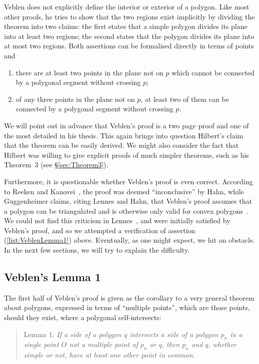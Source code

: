 Veblen does not explicitly define the interior or exterior of a polygon. Like most other proofs, he tries to show that the two regions exist implicitly by dividing the theorem into two claims: the first states that a simple polygon divides its plane into at least two regions; the second states that the polygon divides its plane into at most two regions. Both assertions can be formalised directly in terms of points and 

\begin{enumerate}
\item there are at least two points in the plane not on $p$ which cannot be connected by a polygonal segment without crossing $p$\label{list:VeblenLemma1};
\item of any three points in the plane not on $p$, at least two of them can be connected by a polygonal segment without crossing $p$.
\end{enumerate}

We will point out in advance that Veblen's proof is a two page proof and one of the most detailed in his thesis. This again brings into question Hilbert's claim that the theorem can be easily derived. We might also consider the fact that Hilbert was willing to give explicit proofs of much simpler theorems, such as his Theorem~3 (see \S\ref{sec:Theorem3}). 

Furthermore, it is questionable whether Veblen's proof is even correct. According to Reeken and Kanovei~\cite{HahnInconclusiveIndirect}, the proof was deemed ``inconclusive'' by Hahn, while Guggenheimer claims, citing Lennes and Hahn, that Veblen's proof assumes that a polygon can be triangulated and is otherwise only valid for convex polygons~\cite{GuggenheimerJordanCurve}. We could not find this criticism in Lennes~\cite{LennesPolygon}, and were initially satisfied by Veblen's proof, and so we attempted a verification of assertion (\ref{list:VeblenLemma1}) above. Eventually, as one might expect, we hit an obstacle. In the next few sections, we will try to explain the difficulty.

\subsection{Veblen's Lemma 1}\label{sec:VeblenLemma1}
The first half of Veblen's proof is given as the corollary to a very general theorem about polygons, expressed in terms of ``multiple points'', which are those points, should they exist, where a polygonal self-intersects:
\begin{quote}
Lemma 1. \emph{If a side of a polygon $q$ intersects a side of a polygon $p_n$ in a single point $O$ not a multiple point of $p_n$ or $q$, then $p_n$ and $q$, whether simple or not, have at least one other point in common.} 
\end{quote}

